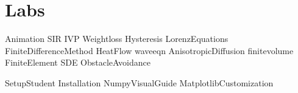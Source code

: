 \documentclass[opener-c,labs,green,nociteref]{HJnewsiambook}
\begin{document}
\part{Labs}
{Animation}
{SIR}
{IVP}
{Weightloss}
{Hysteresis}
{LorenzEquations}
{FiniteDifferenceMethod}
{HeatFlow}
{waveeqn}
{AnisotropicDiffusion}
{finitevolume}
{FiniteElement}
{SDE}
{ObstacleAvoidance}

%
%
%
\begin{appendices}
{SetupStudent}
{Installation}
{NumpyVisualGuide}
 {MatplotlibCustomization}
\end{appendices}



\end{document}
